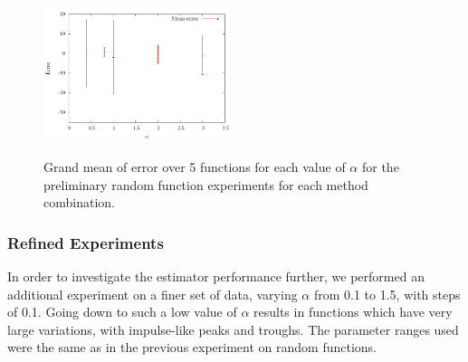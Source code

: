 \documentclass[a4paper,11pt,twoside]{article}
\begin{document}
\begin{figure}[h!]
{    \includegraphics[width=0.5\textwidth]{images/gaussian_pmf_random}
    }
    \caption{Grand mean of error over 5 functions for each value of $\alpha$ for the preliminary random
    function experiments for each method combination.}
    \label{fig:randerror}
    \end{figure}
\subsubsection{Refined Experiments}
\label{sec-8-2-2}

    In order to investigate the estimator performance further, we performed an
    additional experiment on a finer set of data, varying $\alpha$ from 0.1 to
    1.5, with steps of 0.1. Going down to such a low value of $\alpha$ results
    in functions which have very large variations, with impulse-like peaks and
    troughs. The parameter ranges used were the same as in the previous
    experiment on random functions.
\end{document}
